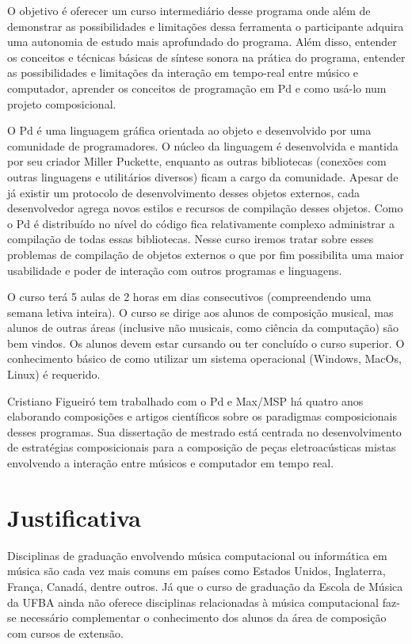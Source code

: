 \documentclass{article}
\begin{document}
 O objetivo é oferecer um curso intermediário desse programa onde além de
demonstrar as possibilidades e limitações dessa ferramenta o participante adquira uma
autonomia de estudo mais aprofundado do programa. Além disso, entender os conceitos e
técnicas básicas de síntese sonora na prática do programa, entender as possibilidades e
limitações da interação em tempo-real entre músico e computador, aprender os conceitos
de programação em Pd e como usá-lo num projeto composicional.

O Pd é uma linguagem gráfica orientada ao objeto e desenvolvido por uma comunidade de programadores.
O núcleo da linguagem é desenvolvida e mantida por seu criador Miller Puckette, enquanto as outras bibliotecas (conexões com outras linguagens e utilitários diversos) ficam a cargo da comunidade. Apesar de já existir um protocolo de desenvolvimento desses objetos externos, cada desenvolvedor agrega novos estilos e recursos
 de compilação desses objetos. Como o Pd é distribuído no nível do código fica relativamente complexo administrar a compilação de todas essas bibliotecas. Nesse curso iremos tratar sobre esses problemas de compilação de objetos externos o que por fim possibilita uma maior usabilidade e poder de interação com outros programas e linguagens.
      

 O curso terá 5 aulas de 2 horas em dias consecutivos (compreendendo uma semana
letiva inteira). O curso se dirige aos alunos de composição musical, mas alunos de outras
áreas (inclusive não musicais, como ciência da computação) são bem vindos. Os alunos
devem estar cursando ou ter concluído o curso superior. O conhecimento básico de como
utilizar um sistema operacional (Windows, MacOs, Linux) é requerido.
      

 Cristiano Figueiró tem trabalhado com o Pd e Max/MSP há quatro anos
elaborando composições e artigos científicos sobre os paradigmas composicionais desses
programas. Sua dissertação de mestrado está centrada no desenvolvimento de estratégias
composicionais para a composição de peças eletroacústicas mistas envolvendo a
interação entre músicos e computador em tempo real.


\section{Justificativa}
\label{sec:justificativa}
           Disciplinas de graduação envolvendo música computacional ou informática em
música são cada vez mais comuns em países como Estados Unidos, Inglaterra, França,
Canadá, dentre outros. Já que o curso de graduação da Escola de Música da UFBA ainda
não oferece disciplinas relacionadas à música computacional faz-se necessário
complementar o conhecimento dos alunos da área de composição com cursos de extensão.
\end{document}
